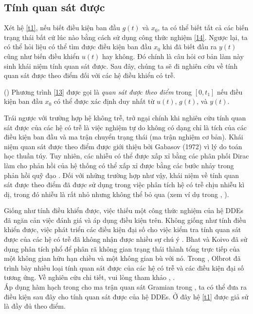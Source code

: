\subsection{Tính quan sát được}\label{sec2.3.2}

Xét hệ \eqref{t1}, nếu biết điều kiện ban đầu $g(t)$ và $x_0$, ta có thể biết tất cả các biến trạng thái bất cứ lúc nào bằng cách sử dụng công thức nghiệm \eqref{14}. Ngược lại, ta có thể hỏi liệu có thể tìm được điều kiện ban đầu $x_0$ khi đã biết đầu ra $y(t)$ cũng như biến điều khiển $u(t)$ hay không. 
Đó chính là câu hỏi cơ bản làm này sinh khái niệm tính quan sát được. Sau đây, chúng ta sẽ đi nghiên cứu về tính quan sát được theo điểm đối với các hệ điều khiển có trễ.

\begin{dng}(\cite{Del72}) Phương trình \eqref{13} được gọi là {\it quan sát được theo điểm} trong $[0, t_1]$ nếu điều kiện ban đầu $x_0$ có thể được xác định duy nhất từ $u(t)$, $g(t)$, và $y(t)$.
\end{dng}	  

Trái ngược với trường hợp hệ không trễ, trở ngại chính khi nghiên cứu tính quan sát được của các hệ có trễ là việc nghiệm tự do không có dạng chỉ là tích của các điều kiện ban đầu và ma trận chuyển trạng thái (ma trận nghiệm cơ bản).
Khái niệm quan sát được theo điểm được giới thiệu bởi Gabasov (1972) vì lý do toán học thuần túy. Tuy nhiên, các nhiễu có thể được xấp xỉ bằng các phân phối Dirac làm cho phản hồi của hệ thống có thể xấp xỉ được bằng các bước nhảy trong phản hồi quỹ đạo \cite{Lee81}. Đối với những trường hợp như vậy, khái niệm về tính quan sát được theo điểm đã được sử dụng trong việc phân tích hệ có trễ chịu nhiễu kì dị, trong đó nhiễu là rất nhỏ nhưng không thể bỏ qua (xem ví dụ trong \cite{Gli04}, \cite{Kop98}).    

Giống như tính điều khiển được, việc thiếu một công thức nghiệm của hệ DDEs đã ngăn cản việc đánh giá và áp dụng điều kiện trên. Không giống như tính điều khiển được, việc phát triển các điều kiện đại số cho việc kiểm tra tính quan sát được của các hệ có trễ đã không nhận được nhiều sự chú ý \cite{Mal87}. Bhat và Koivo \cite{Bha76} đã sử dụng phân tích phổ để phân rã không gian trạng thái thành tổng trực tiếp của một không gian hữu hạn chiều và một không gian bù với nó. Trong \cite{LeeOl81}, Olbrot đã trình bày nhiều loại tính quan sát được của các hệ có trễ và các điều kiện đại số tương ứng. Về nghiên cứu chi tiết, vui lòng tham khảo \cite{LeeOl81}, \cite{Mal87}.\\
Áp dụng hàm hạch trong \cite{Cho72} cho ma trận quan sát Gramian trong \cite{Del72}, ta có thể đưa ra điều kiện sau đây cho tính quan sát được của hệ DDEs. Ở đây hệ \eqref{t1} được giả sử là đầy đủ theo điểm.


